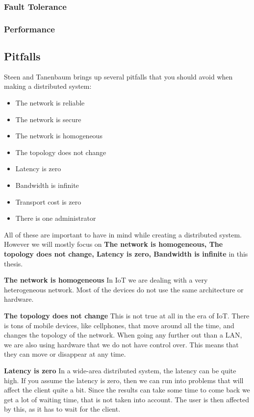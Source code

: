 \subsubsection{Fault Tolerance}
\subsubsection{Performance}

\subsection{Pitfalls}
Steen and Tanenbaum \cite{steen_distributed_2017} brings up several pitfalls that you should avoid when making a distributed system:
\begin{itemize}
    \item The network is reliable
    \item The network is secure
    \item The network is homogeneous
    \item The topology does not change
    \item Latency is zero
    \item Bandwidth is infinite
    \item Transport cost is zero
    \item There is one administrator
\end{itemize}
All of these are important to have in mind while creating a distributed system. However we will mostly focus on \textbf{The network is homogeneous, The topology does not change, Latency is zero, Bandwidth is infinite} in this thesis. 

\textbf{The network is homogeneous}
In IoT we are dealing with a very heterogeneous network. Most of the devices do not use the same architecture or hardware.

\textbf{The topology does not change}
This is not true at all in the era of IoT. There is tons of mobile devices, like cellphones, that move around all the time, and changes the topology of the network. When going any further out than a LAN, we are also using hardware that we do not have control over. This means that they can move or disappear at any time.

\textbf{Latency is zero}
In a wide-area distributed system, the latency can be quite high. If you assume the latency is zero, then we can run into problems that will affect the client quite a bit. Since the results can take some time to come back we get a lot of waiting time, that is not taken into account. The user is then affected by this, as it has to wait for the client. 

